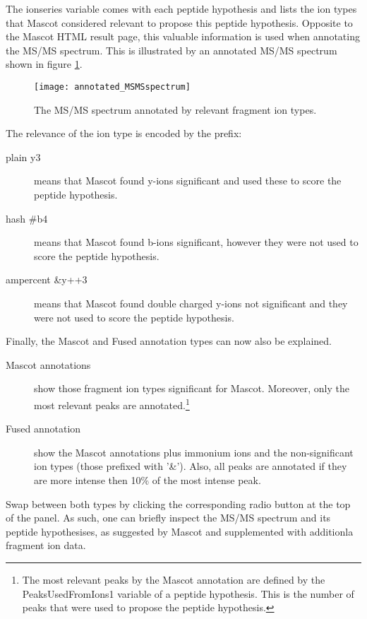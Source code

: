 \npar The ionseries variable comes with each peptide hypothesis and lists the ion types that Mascot considered relevant to propose this peptide hypothesis. Opposite to the Mascot HTML result page, this valuable information is used when annotating the MS/MS spectrum. This is illustrated by an annotated MS/MS spectrum shown in figure \ref{annotated_MSMSspectrum}.
\begin{figure}[t!]
\begin{center}
	\texttt{[image: annotated\_MSMSspectrum]}
	\caption{\label{annotated_MSMSspectrum}The MS/MS spectrum annotated by relevant fragment ion types.}
\end{center}
\end{figure}
\npar The relevance of the ion type is encoded by the prefix:
\begin{description}
	\item[plain y3] means that Mascot found y-ions significant and used these to score the peptide hypothesis.
	\item[hash \#b4] means that Mascot found b-ions significant, however they were not used to score the peptide hypothesis.
	\item[ampercent \&y++3] means that Mascot found double charged y-ions not significant and they were not used to score the peptide hypothesis.
\end{description}
\npar Finally, the Mascot and Fused annotation types can now also be explained.\label{annotationtypes}
\begin{description}
	\item[Mascot annotations] show those fragment ion types significant for Mascot. Moreover, only the most relevant peaks are annotated.\footnote{The most relevant peaks by the Mascot annotation are defined by the PeaksUsedFromIons1 variable of a peptide hypothesis. This is the number of peaks that were used to propose the peptide hypothesis.}
	\item[Fused annotation] show the Mascot annotations plus immonium ions and the non-significant ion types (those prefixed with '\&'). Also, all peaks are annotated if they are more intense then 10\% of the most intense peak. 
\end{description}
\npar Swap between both types by clicking the corresponding radio button at the top of the panel.
\npar As such, one can briefly inspect the MS/MS spectrum and its peptide hypothesises, as suggested by Mascot and supplemented with additionla fragment ion data.
%
